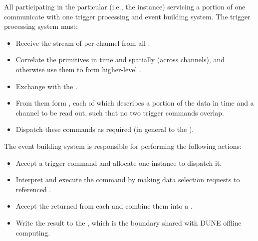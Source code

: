 All participating  in the particular 
(i.e., the  instance) servicing a portion of one 
communicate with one trigger processing and event building system.
The trigger processing system must:
\begin{itemize}
\item Receive the stream of per-channel  from all .
\item Correlate the primitives in time and spatially (across channels), and otherwise use them to form higher-level .
\item Exchange  with the .
\item From them form , each of which describes a
  portion of the data in time and a channel to be read out, such that
  no two trigger commands overlap.
\item Dispatch these commands as required (in general to the ).
\end{itemize}
The event building system is responsible for performing the following actions:
\begin{itemize}
\item Accept a trigger command and allocate one  instance to dispatch it.
\item %
Interpret and execute the command by making
  data selection requests to referenced .
\item %
Accept the returned  from each
   and combine them into a .
\item Write the result to the , which is the boundary
  shared with DUNE offline computing.
\end{itemize}

